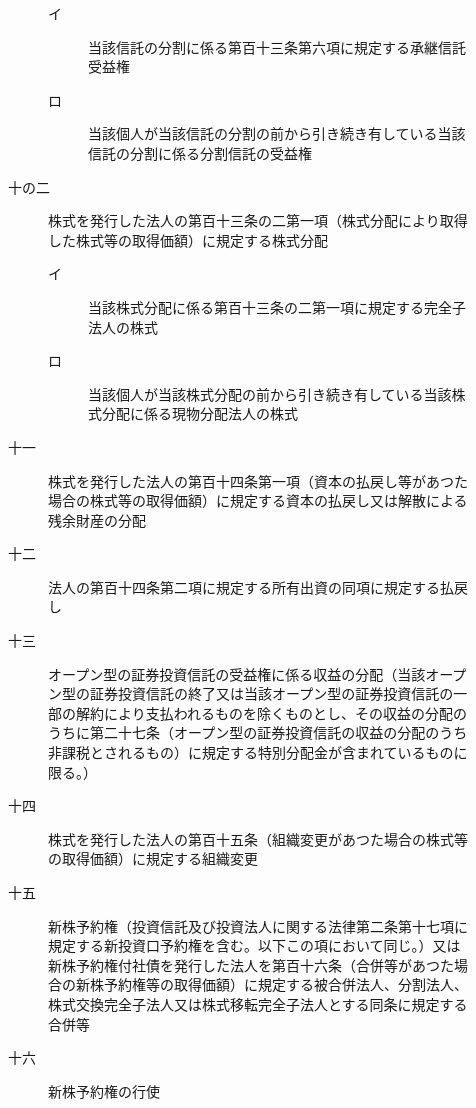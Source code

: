 \documentclass[twocolumn,a4j,10pt]{ltjtarticle}
\begin{document}
\begin{description}
\begin{description}
\begin{description}
\item[イ]当該信託の分割に係る第百十三条第六項に規定する承継信託受益権
\item[ロ]当該個人が当該信託の分割の前から引き続き有している当該信託の分割に係る分割信託の受益権
\end{description}
\item[十の二]株式を発行した法人の第百十三条の二第一項（株式分配により取得した株式等の取得価額）に規定する株式分配
\begin{description}
\item[イ]当該株式分配に係る第百十三条の二第一項に規定する完全子法人の株式
\item[ロ]当該個人が当該株式分配の前から引き続き有している当該株式分配に係る現物分配法人の株式
\end{description}
\item[十一]株式を発行した法人の第百十四条第一項（資本の払戻し等があつた場合の株式等の取得価額）に規定する資本の払戻し又は解散による残余財産の分配
\item[十二]法人の第百十四条第二項に規定する所有出資の同項に規定する払戻し
\item[十三]オープン型の証券投資信託の受益権に係る収益の分配（当該オープン型の証券投資信託の終了又は当該オープン型の証券投資信託の一部の解約により支払われるものを除くものとし、その収益の分配のうちに第二十七条（オープン型の証券投資信託の収益の分配のうち非課税とされるもの）に規定する特別分配金が含まれているものに限る。）
\item[十四]株式を発行した法人の第百十五条（組織変更があつた場合の株式等の取得価額）に規定する組織変更
\item[十五]新株予約権（投資信託及び投資法人に関する法律第二条第十七項に規定する新投資口予約権を含む。以下この項において同じ。）又は新株予約権付社債を発行した法人を第百十六条（合併等があつた場合の新株予約権等の取得価額）に規定する被合併法人、分割法人、株式交換完全子法人又は株式移転完全子法人とする同条に規定する合併等
\item[十六]新株予約権の行使
\end{description}

\end{description}
\end{document}
